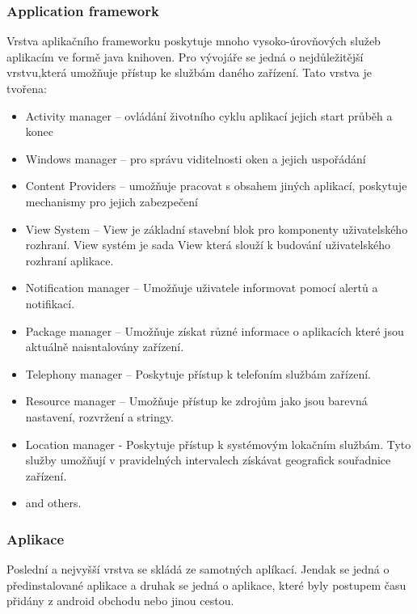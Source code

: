 \subsubsection{Application framework}
Vrstva aplikačního frameworku poskytuje mnoho vysoko-úrovňových služeb aplikacím ve formě java knihoven. Pro vývojáře se jedná o nejdůležitější vrstvu,která umožňuje přístup ke službám daného zařízení. Tato vrstva je tvořena: 
\begin{itemize} %
\item Activity manager -- ovládání životního cyklu aplikací jejich start průběh a konec
\item Windows manager -- pro správu viditelnosti oken a jejich uspořádání
\item Content Providers -- umožňuje pracovat s obsahem jiných aplikací, poskytuje mechanismy pro jejich zabezpečení 
\item View System -- View je základní stavební blok pro komponenty uživatelského rozhraní. View systém je sada View která slouží k budování uživatelského rozhraní aplikace.
\item Notification manager -- Umožňuje uživatele informovat pomocí alertů a notifikací.
\item Package manager -- Umožňuje získat různé informace o aplikacích které jsou aktuálně naisntalovány  zařízení.
\item Telephony manager -- Poskytuje přístup k telefoním službám zařízení. 
\item Resource manager -- Umožňuje přístup ke zdrojům jako jsou barevná nastavení, rozvržení a stringy.
\item Location manager - Poskytuje přístup k systémovým lokačním službám. Tyto služby umožňují v pravidelných intervalech získávat geografick souřadnice zařízení.
\item and others.
\end{itemize}

\subsubsection{Aplikace}
Poslední a nejvyšší vrstva se skládá ze samotných aplíkací. Jendak se jedná o předinstalované aplikace a druhak se jedná o aplikace, které byly postupem času přidány z android obchodu nebo jinou cestou.

